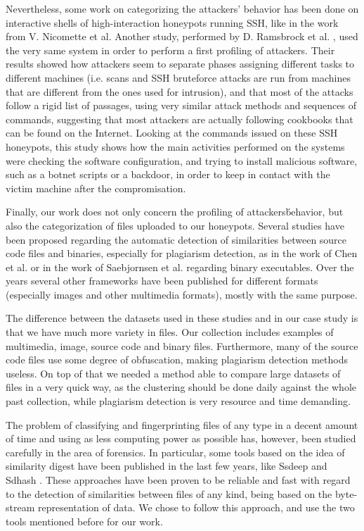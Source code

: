 Nevertheless, some work on categorizing the attackers' behavior has been done on interactive shells of high-interaction honeypots running SSH, like in the work from V. Nicomette et al\cite{highhoney}. Another study, performed by D. Ramsbrock et al. \cite{sshprofiling}, used the very same system in order to perform a first profiling of attackers. Their results showed how attackers seem to separate phases assigning different tasks to different machines (i.e. scans and SSH bruteforce attacks are run from machines that are different from the ones used for intrusion), and that most of the attacks follow a rigid list of passages, using very similar attack methods and sequences of commands, suggesting that most attackers are actually following cookbooks that can be found on the Internet. Looking at the commands issued on these SSH honeypots, this study shows how the main activities performed on the systems were checking the software configuration, and trying to install malicious software, such as a botnet scripts or a backdoor, in order to keep in contact with the victim machine after the compromisation.

Finally, our work does not only concern the profiling of attackers\' behavior, but also the categorization of files uploaded to our honeypots. Several studies have been proposed regarding the automatic detection of similarities between source code files and binaries, especially for plagiarism detection, as in the work of Chen et al. \cite{plagdet1} or in the work of Saebjornsen et al. \cite{plagdet2} regarding binary executables. Over the years several other frameworks have been published for different formats (especially images and other multimedia formats), mostly with the same purpose.

The difference between the datasets used in these studies and in our case study is that we have much more variety in files. Our collection includes examples of multimedia, image, source code and binary files. Furthermore, many of the source code files use some degree of obfuscation, making plagiarism detection methods useless. On top of that we needed a method able to compare large datasets of files in a very quick way, as the clustering should be done daily against the whole past collection, while plagiarism detection is very resource and time demanding.

The problem of classifying and fingerprinting files of any type in a decent amount of time and using as less computing power as possible has, however, been studied carefully in the area of forensics. In particular, some tools based on the idea of similarity digest have been published in the last few years, like Ssdeep \cite{ssdeep} and Sdhash \cite{sdhash}. These approaches have been proven to be reliable and fast with regard to the detection of similarities between files of any kind, being based on the byte-stream representation of data. We chose to follow this approach, and use the two tools mentioned before for our work.
